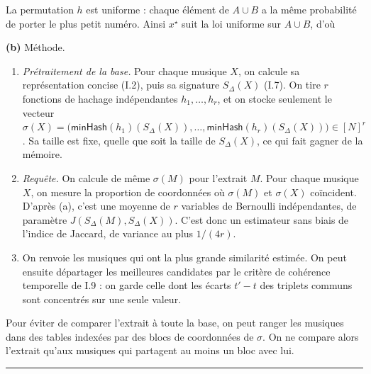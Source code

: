 \documentclass[11pt,a4paper]{article}
\providecommand{\tightlist}{\setlength{\itemsep}{0pt}\setlength{\parskip}{0pt}}
\newcommand{\equationajustee}[1]{%
  \sbox{\boiteequation}{$\displaystyle #1$}%
  \ifdim\wd\boiteequation>\linewidth
    \[\resizebox{\linewidth}{!}{\usebox{\boiteequation}}\]%
  \else
    \[#1\]%
  \fi}
\begin{document}
La permutation \(h\) est uniforme : chaque élément de \(A\cup B\) a la même probabilité de porter le plus petit numéro. Ainsi \(x^\star\) suit la loi uniforme sur \(A\cup B\), d'où

\equationajustee{\boxed{\begin{aligned}
\Pr\big(\mathsf{minHash}(h)(A)=\mathsf{minHash}(h)(B)\big)&=\Pr(x^\star\in A\cap B)\\
&=\frac{|A\cap B|}{|A\cup B|}\\
&=J(A,B).
\end{aligned}}}

\textbf{(b)} Méthode.

\begin{enumerate}
\def\labelenumi{\arabic{enumi}.}
\tightlist
\item
  \emph{Prétraitement de la base.} Pour chaque musique \(X\), on calcule sa représentation concise (I.2), puis sa signature \(S_\Delta(X)\) (I.7). On tire \(r\) fonctions de hachage indépendantes \(h_1,\dots,h_r\), et on stocke seulement le vecteur \(\sigma(X)=\big(\mathsf{minHash}(h_1)(S_\Delta(X)),\allowbreak \dots,\allowbreak \mathsf{minHash}(h_r)(S_\Delta(X))\big)\in[N]^r\). Sa taille est fixe, quelle que soit la taille de \(S_\Delta(X)\), ce qui fait gagner de la mémoire.
\item
  \emph{Requête.} On calcule de même \(\sigma(M)\) pour l'extrait \(M\). Pour chaque musique \(X\), on mesure la proportion de coordonnées où \(\sigma(M)\) et \(\sigma(X)\) coïncident.
  D'après (a), c'est une moyenne de \(r\) variables de Bernoulli indépendantes, de paramètre \(J(S_\Delta(M),S_\Delta(X))\). C'est donc un estimateur sans biais de l'indice de Jaccard, de variance au plus \(1/(4r)\).
\item
  On renvoie les musiques qui ont la plus grande similarité estimée. On peut ensuite départager les meilleures candidates par le critère de cohérence temporelle de I.9 : on garde celle dont les écarts \(t'-t\) des triplets communs sont concentrés sur une seule valeur.
\end{enumerate}

Pour éviter de comparer l'extrait à toute la base, on peut ranger les musiques dans des tables indexées par des blocs de coordonnées de \(\sigma\). On ne compare alors l'extrait qu'aux musiques qui partagent au moins un bloc avec lui.

\begin{center}\rule{0.5\linewidth}{0.5pt}\end{center}
\end{document}
